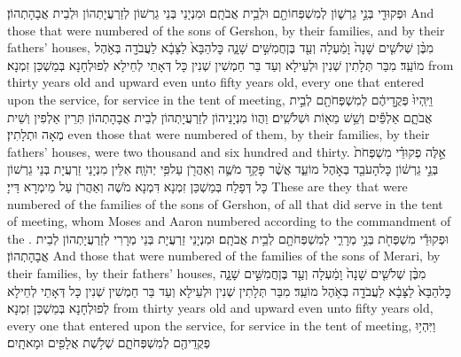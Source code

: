 {וּפְקוּדֵ֖י בְּנֵ֣י גֵרְשׁ֑וֹן לְמִשְׁפְּחוֹתָ֖ם וּלְבֵ֥ית אֲבֹתָֽם׃}
{וּמִנְיָנֵי בְּנֵי גֵרְשׁוֹן לְזַרְעֲיָתְהוֹן וּלְבֵית אֲבָהָתְהוֹן׃}
{And those that were numbered of the sons of Gershon, by their families, and by their fathers’ houses,}{}
{מִבֶּ֨ן שְׁלֹשִׁ֤ים שָׁנָה֙ וָמַ֔עְלָה וְעַ֖ד בֶּן\maqqaf חֲמִשִּׁ֣ים שָׁנָ֑ה כׇּל\maqqaf הַבָּא֙ לַצָּבָ֔א לַעֲבֹדָ֖ה בְּאֹ֥הֶל מוֹעֵֽד׃}
{מִבַּר תְּלָתִין שְׁנִין וּלְעֵילָא וְעַד בַּר חַמְשִׁין שְׁנִין כָּל דְּאָתֵי לְחֵילָא לְפוּלְחָנָא בְּמַשְׁכַּן זִמְנָא׃}
{from thirty years old and upward even unto fifty years old, every one that entered upon the service, for service in the tent of meeting,}{}
{וַיִּֽהְיוּ֙ פְּקֻ֣דֵיהֶ֔ם לְמִשְׁפְּחֹתָ֖ם לְבֵ֣ית אֲבֹתָ֑ם אַלְפַּ֕יִם וְשֵׁ֥שׁ מֵא֖וֹת וּשְׁלֹשִֽׁים׃}
{וַהֲווֹ מִנְיָנֵיהוֹן לְזַרְעֲיָתְהוֹן לְבֵית אֲבָהָתְהוֹן תְּרֵין אַלְפִין וְשֵׁית מְאָה וּתְלָתִין׃}
{even those that were numbered of them, by their families, by their fathers’ houses, were two thousand and six hundred and thirty.}{}
{אֵ֣לֶּה פְקוּדֵ֗י מִשְׁפְּחֹת֙ בְּנֵ֣י גֵרְשׁ֔וֹן כׇּל\maqqaf הָעֹבֵ֖ד בְּאֹ֣הֶל מוֹעֵ֑ד אֲשֶׁ֨ר פָּקַ֥ד מֹשֶׁ֛ה וְאַהֲרֹ֖ן עַל\maqqaf פִּ֥י יְהֹוָֽה׃}
{אִלֵּין מִנְיָנֵי זַרְעֲיָת בְּנֵי גֵרְשׁוֹן כָּל דְּפָלַח בְּמַשְׁכַּן זִמְנָא דִּמְנָא מֹשֶׁה וְאַהֲרֹן עַל מֵימְרָא דַּייָ׃}
{These are they that were numbered of the families of the sons of Gershon, of all that did serve in the tent of meeting, whom Moses and Aaron numbered according to the commandment of the \lord.}{}
{וּפְקוּדֵ֕י מִשְׁפְּחֹ֖ת בְּנֵ֣י מְרָרִ֑י לְמִשְׁפְּחֹתָ֖ם לְבֵ֥ית אֲבֹתָֽם׃}
{וּמִנְיָנֵי זַרְעֲיָת בְּנֵי מְרָרִי לְזַרְעֲיָתְהוֹן לְבֵית אֲבָהָתְהוֹן׃}
{And those that were numbered of the families of the sons of Merari, by their families, by their fathers’ houses,}{}
{מִבֶּ֨ן שְׁלֹשִׁ֤ים שָׁנָה֙ וָמַ֔עְלָה וְעַ֖ד בֶּן\maqqaf חֲמִשִּׁ֣ים שָׁנָ֑ה כׇּל\maqqaf הַבָּא֙ לַצָּבָ֔א לַעֲבֹדָ֖ה בְּאֹ֥הֶל מוֹעֵֽד׃}
{מִבַּר תְּלָתִין שְׁנִין וּלְעֵילָא וְעַד בַּר חַמְשִׁין שְׁנִין כָּל דְּאָתֵי לְחֵילָא לְפוּלְחָנָא בְּמַשְׁכַּן זִמְנָא׃}
{from thirty years old and upward even unto fifty years old, every one that entered upon the service, for service in the tent of meeting,}{}
{וַיִּהְי֥וּ פְקֻדֵיהֶ֖ם לְמִשְׁפְּחֹתָ֑ם שְׁלֹ֥שֶׁת אֲלָפִ֖ים וּמָאתָֽיִם׃}
